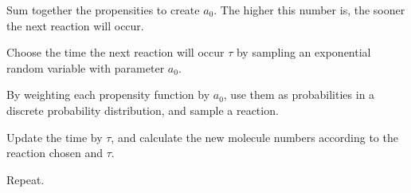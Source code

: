 \begin{enumerate}[label=(\alph*)]
    Sum together the propensities to create $a_0$. The higher this number is, the sooner the next reaction will occur.

    Choose the time the next reaction will occur $\tau$ by sampling an exponential random variable with parameter $a_0$.

    By weighting each propensity function by $a_0$, use them as probabilities in a discrete probability distribution, and sample a reaction.

    Update the time by $\tau$, and calculate the new molecule numbers according to the reaction chosen and $\tau$.

    Repeat.




    
\end{enumerate}


